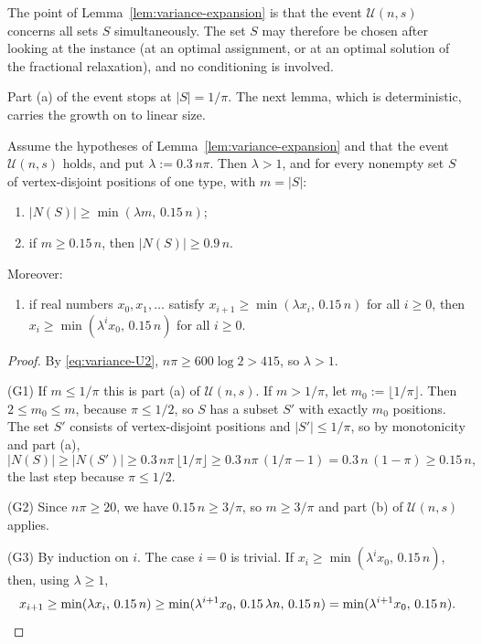The point of Lemma~\ref{lem:variance-expansion} is that the event $\mathcal U(n,s)$
concerns all sets $S$ simultaneously. The set $S$ may therefore be chosen after looking at
the instance (at an optimal assignment, or at an optimal solution of the fractional
relaxation), and no conditioning is involved.

Part (a) of the event stops at $|S|=1/\pi$. The next lemma, which is deterministic, carries
the growth on to linear size.

\begin{lemma}\label{lem:variance-growth}
Assume the hypotheses of Lemma~\ref{lem:variance-expansion} and that the event
$\mathcal U(n,s)$ holds, and put $\lambda:=0.3\,n\pi$. Then $\lambda>1$, and for every
nonempty set $S$ of vertex-disjoint positions of one type, with $m=|S|$:
\begin{enumerate}
\item[\textup{(G1)}] $|N(S)|\ge\min(\lambda m,\,0.15\,n)$;
\item[\textup{(G2)}] if $m\ge0.15\,n$, then $|N(S)|\ge0.9\,n$.
\end{enumerate}
Moreover:
\begin{enumerate}
\item[\textup{(G3)}] if real numbers $x_0,x_1,\dots$ satisfy
$x_{i+1}\ge\min(\lambda x_i,\,0.15\,n)$ for all $i\ge0$, then
$x_i\ge\min(\lambda^ix_0,\,0.15\,n)$ for all $i\ge0$.
\end{enumerate}
\end{lemma}

\begin{proof}
By \eqref{eq:variance-U2}, $n\pi\ge600\log2>415$, so $\lambda>1$.

(G1) If $m\le1/\pi$ this is part (a) of $\mathcal U(n,s)$. If $m>1/\pi$, let
$m_0:=\lfloor1/\pi\rfloor$. Then $2\le m_0\le m$, because $\pi\le1/2$, so $S$ has a subset
$S'$ with exactly $m_0$ positions. The set $S'$ consists of vertex-disjoint positions and
$|S'|\le1/\pi$, so by monotonicity and part (a),
\[
|N(S)|\ge|N(S')|\ge0.3\,n\pi\,\lfloor1/\pi\rfloor\ge0.3\,n\pi\,(1/\pi-1)
=0.3\,n\,(1-\pi)\ge0.15\,n,
\]
the last step because $\pi\le1/2$.

(G2) Since $n\pi\ge20$, we have $0.15\,n\ge3/\pi$, so $m\ge3/\pi$ and part (b) of
$\mathcal U(n,s)$ applies.

(G3) By induction on $i$. The case $i=0$ is trivial. If
$x_i\ge\min(\lambda^ix_0,\,0.15\,n)$, then, using $\lambda\ge1$,
\[
x_{i+1}\ge\min(\lambda x_i,\,0.15\,n)
\ge\min(\lambda^{i+1}x_0,\,0.15\,\lambda n,\,0.15\,n)
=\min(\lambda^{i+1}x_0,\,0.15\,n).\qedhere
\]
\end{proof}

